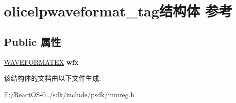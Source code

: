 \hypertarget{structolicelpwaveformat__tag}{}\section{olicelpwaveformat\+\_\+tag结构体 参考}
\label{structolicelpwaveformat__tag}
\subsection*{Public 属性}
\begin{DoxyCompactItemize}
\item 
\mbox{\label{structolicelpwaveformat__tag_aa1dc8121c76456a0f6f61ab9f613afc5}} 
\hyperlink{struct_w_a_v_e_f_o_r_m_a_t_e_x}{W\+A\+V\+E\+F\+O\+R\+M\+A\+T\+EX} {\bfseries wfx}
\end{DoxyCompactItemize}


该结构体的文档由以下文件生成\+:\begin{DoxyCompactItemize}
\item 
E\+:/\+React\+O\+S-\/0../sdk/include/psdk/mmreg.\+h\end{DoxyCompactItemize}
